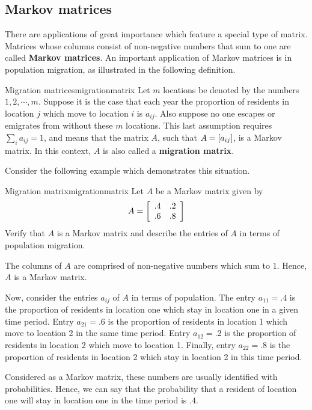 \subsection{Markov matrices}

There are applications of great importance which feature a special type of matrix.  Matrices whose columns consist of non-negative numbers that sum to one are
called \textbf{Markov matrices}. An important application of Markov matrices is
in population migration, as illustrated in the following definition. 

\begin{definition}{Migration matrices}{migrationmatrix}
Let $m$ locations be denoted by the numbers $1,2,\cdots ,m.$ Suppose
it is the case that each year the proportion of residents in location
$j$ which move to location $i$ is $a_{ij}$. Also suppose no one
escapes or emigrates from without these $m$ locations. This last
assumption requires $\sum_{i}a_{ij}=1$, and means that the matrix $A$,
such that $A = \left[ a_{ij} \right]$, is a Markov matrix. In this context,
$A$ is also called a \textbf{migration matrix}.
\end{definition}

Consider the following example which demonstrates this situation.

\begin{example}{Migration matrix}{migrationmatrix}
Let $A$ be a Markov matrix given by 
\begin{equation*}
A = 
\left[
\begin{array}{rr}
.4 & .2 \\
.6 & .8
\end{array}
\right]
\end{equation*}
Verify that $A$ is a Markov matrix and describe the entries of $A$ in terms of population migration.
\end{example}

\begin{solution}
The columns of $A$ are comprised of non-negative numbers which sum to $1$. Hence, $A$ is a Markov matrix. 

Now, consider the entries $a_{ij}$ of $A$ in terms of population. The
entry $a_{11} = .4$ is the proportion of residents in location one
which stay in location one in a given time period.  Entry $a_{21} =
.6$ is the proportion of residents in location 1 which move to
location 2 in the same time period. Entry $a_{12} = .2$ is the
proportion of residents in location 2 which move to location
1. Finally, entry $a_{22} = .8$ is the proportion of residents in
location 2 which stay in location 2 in this time period.  

Considered as a Markov matrix, these numbers are usually identified
with probabilities. Hence, we can say that the probability that a
resident of location one will stay in location one in the time period
is $.4$.
\end{solution}

